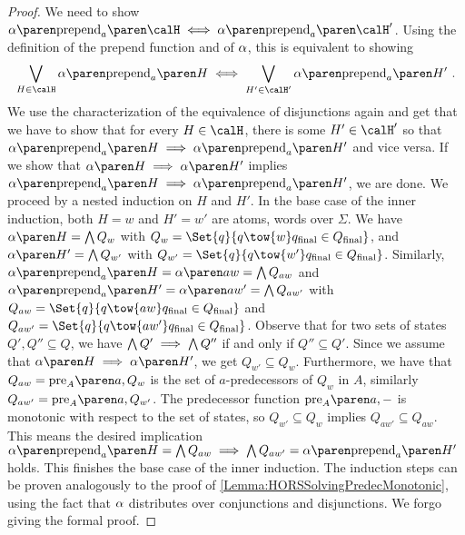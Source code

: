 \documentclass[../../diss.tex]{subfiles}
\begin{document}
\begin{proof}
    We need to show $\abs{\prepend{a}{\sof}} \lequiv \abs{\prepend{a}{\sof'}}$.
    Using the definition of the prepend function and of $\abs$, this is equivalent to showing
    \[
        \bigvee_{H \in \sof} \abs{\prepend{a}{H}} \lequiv \bigvee_{H' \in \sof'} \abs{\prepend{a}{H'}}
        \ .
    \]
    We use the characterization of the equivalence of disjunctions again and get that we have to show that for every $H \in \sof$, there is some $H' \in \sof'$ so that $\abs{\prepend{a}{H}} \lleq \abs{\prepend{a}{H'}}$ and vice versa.
    If we show that $\abs{H} \lleq \abs{H'}$ implies $\abs{\prepend{a}{H}} \lleq \abs{\prepend{a}{H'}}$, we are done.
    We proceed by a nested induction on $H$ and $H'$.
    In the base case of the inner induction, both $H = w$ and $H' = w'$ are atoms, words over $\Sigma$.
    We have $\abs{H} = \bigwedge Q_w$ with $Q_w = \Set{ q }{ q \tow{w} \qfinal \in \QF}$, and $\abs{H'} = \bigwedge Q_{w'}$ with $Q_{w'} = \Set{ q }{ q \tow{w'} \qfinal \in \QF}$.
    Similarly, $\abs{\prepend{a}{H}} = \abs{aw} = \bigwedge Q_{aw}$ and $\abs{\prepend{a}{H'}} = \abs{aw'} = \bigwedge Q_{aw'}$ with $Q_{aw} = \Set{ q }{ q \tow{aw} \qfinal \in \QF}$ and $Q_{aw'} = \Set{ q }{ q \tow{aw'} \qfinal \in \QF}$.
    Observe that for two sets of states $Q', Q'' \subseteq Q$, we have $\bigwedge Q' \implies \bigwedge Q''$ if and only if $Q'' \subseteq Q'$.
    Since we assume that $\abs{H} \lleq \abs{H'}$, we get $Q_{w'} \subseteq Q_{w}$.
    Furthermore, we have that $Q_{aw} = \pre{A}{a}{Q_w}$ is the set of $a$-predecessors of $Q_{w}$ in $A$, similarly $Q_{a{w'}} = \pre{A}{a}{Q_{w'}}$.
    The predecessor function $\pre{A}{a}{-}$ is monotonic with respect to the set of states, so $Q_{w'} \subseteq Q_{w}$ implies $Q_{aw'} \subseteq Q_{aw}$.
    This means the desired implication $\abs{\prepend{a}{H}} = \bigwedge Q_{aw} \lleq \bigwedge Q_{aw'} = \abs{\prepend{a}{H'}}$ holds.
    This finishes the base case of the inner induction.
    The induction steps can be proven analogously to the proof of \cref{Lemma:HORSSolvingPredecMonotonic}, using the fact that $\abs$ distributes over conjunctions and disjunctions.
    We forgo giving the formal proof.


\end{proof}
\end{document}
